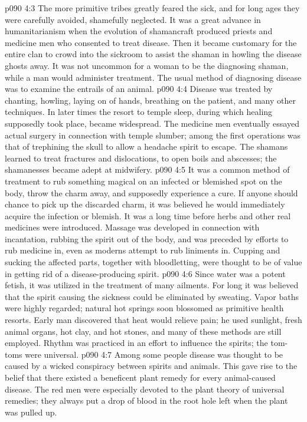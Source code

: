\pc \vs p090 4:3 The more primitive tribes greatly feared the sick, and for long ages they were carefully avoided, shamefully neglected. It was a great advance in humanitarianism when the evolution of shamancraft produced priests and medicine men who consented to treat disease. Then it became customary for the entire clan to crowd into the sickroom to assist the shaman in howling the disease ghosts away. It was not uncommon for a woman to be the diagnosing shaman, while a man would administer treatment. The usual method of diagnosing disease was to examine the entrails of an animal.
\vs p090 4:4 Disease was treated by chanting, howling, laying on of hands, breathing on the patient, and many other techniques. In later times the resort to temple sleep, during which healing supposedly took place, became widespread. The medicine men eventually essayed actual surgery in connection with temple slumber; among the first operations was that of trephining the skull to allow a headache spirit to escape. The shamans learned to treat fractures and dislocations, to open boils and abscesses; the shamanesses became adept at midwifery.
\vs p090 4:5 It was a common method of treatment to rub something magical on an infected or blemished spot on the body, throw the charm away, and supposedly experience a cure. If anyone should chance to pick up the discarded charm, it was believed he would immediately acquire the infection or blemish. It was a long time before herbs and other real medicines were introduced. Massage was developed in connection with incantation, rubbing the spirit out of the body, and was preceded by efforts to rub medicine in, even as moderns attempt to rub liniments in. Cupping and sucking the affected parts, together with bloodletting, were thought to be of value in getting rid of a disease\hyp{}producing spirit.
\vs p090 4:6 Since water was a potent fetish, it was utilized in the treatment of many ailments. For long it was believed that the spirit causing the sickness could be eliminated by sweating. Vapor baths were highly regarded; natural hot springs soon blossomed as primitive health resorts. Early man discovered that heat would relieve pain; he used sunlight, fresh animal organs, hot clay, and hot stones, and many of these methods are still employed. Rhythm was practiced in an effort to influence the spirits; the tom\hyp{}toms were universal.\plusone
\vs p090 4:7 Among some people disease was thought to be caused by a wicked conspiracy between spirits and animals. This gave rise to the belief that there existed a beneficent plant remedy for every animal\hyp{}caused disease. The red men were especially devoted to the plant theory of universal remedies; they always put a drop of blood in the root hole left when the plant was pulled up.
